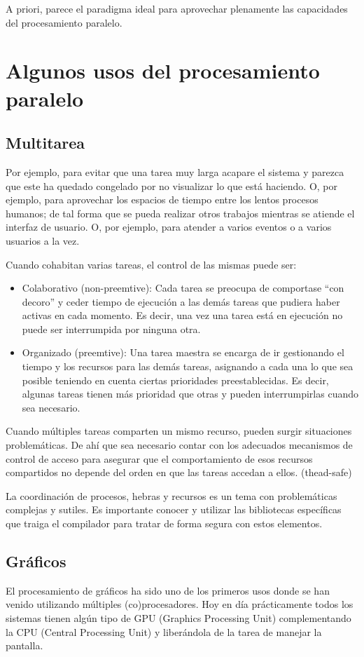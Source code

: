 \documentclass[spanish,12pt,a4paper,final,oneside]{book}
\begin{document}
A priori, parece el paradigma ideal para aprovechar plenamente las capacidades del procesamiento paralelo.



\section{Algunos usos del procesamiento paralelo}


\subsection{Multitarea}
Por ejemplo, para evitar que una tarea muy larga acapare el sistema y parezca que este ha quedado congelado por no visualizar lo que está haciendo. O, por ejemplo, para aprovechar los espacios de tiempo entre los lentos procesos humanos; de tal forma que se pueda realizar otros trabajos mientras se atiende el interfaz de usuario. O, por ejemplo, para atender a varios eventos o a varios usuarios a la vez.

Cuando cohabitan varias tareas, el control de las mismas puede ser:
\begin{itemize}
\item Colaborativo (non-preemtive): Cada tarea se preocupa de comportase ``con decoro'' y ceder tiempo de ejecución a las demás tareas que pudiera haber activas en cada momento. Es decir, una vez una tarea está en ejecución no puede ser interrumpida por ninguna otra.
\item Organizado (preemtive): Una tarea maestra se encarga de ir gestionando el tiempo y los recursos para las demás tareas, asignando a cada una lo que sea posible teniendo en cuenta ciertas prioridades preestablecidas. Es decir, algunas tareas tienen más prioridad que otras y pueden interrumpirlas cuando sea necesario.
\end{itemize}

Cuando múltiples tareas comparten un mismo recurso, pueden surgir situaciones problemáticas. De ahí que sea necesario contar con los adecuados mecanismos de control de acceso para asegurar que el comportamiento de esos recursos compartidos no depende del orden en que las tareas accedan a ellos. (thead-safe)

La coordinación de procesos, hebras y recursos es un tema con problemáticas complejas y sutiles. Es importante conocer y utilizar las bibliotecas específicas que traiga el compilador para tratar de forma segura con estos elementos.

\subsection{Gráficos}
El procesamiento de gráficos ha sido uno de los primeros usos donde se han venido utilizando múltiples (co)procesadores. Hoy en día prácticamente todos los sistemas tienen algún tipo de GPU (Graphics Processing Unit) complementando la CPU (Central Processing Unit) y liberándola de la tarea de manejar la pantalla. 
\end{document}
